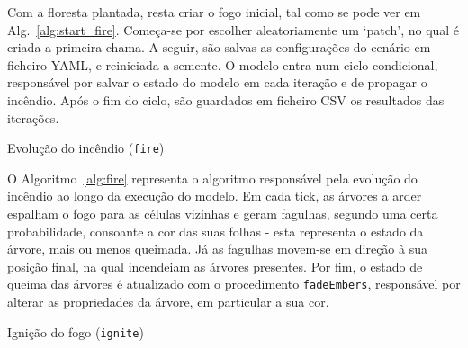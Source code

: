 Com a floresta plantada, resta criar o fogo inicial, tal como se pode ver em Alg.~\ref{alg:start_fire}.
Começa-se por escolher aleatoriamente um ‘patch’, no qual é criada a primeira chama.
A seguir, são salvas as configurações do cenário em ficheiro YAML, e reiniciada a semente.
O modelo entra num ciclo condicional, responsável por salvar o estado do modelo em cada iteração e de propagar o incêndio.
Após o fim do ciclo, são guardados em ficheiro CSV os resultados das iterações.


\begin{algorithm}
    \caption{Evolução do incêndio (\texttt{fire})}\label{alg:fire}
    \EndFor
    \fadeEmbers{}\;
    \tick{}\;
\end{algorithm}

O Algoritmo~\ref{alg:fire} representa o algoritmo responsável pela evolução do incêndio ao longo da execução do modelo.
Em cada tick, as árvores a arder espalham o fogo para as células vizinhas e geram fagulhas, segundo uma certa probabilidade, consoante a cor das suas folhas - esta representa o estado da árvore, mais ou menos queimada.
Já as fagulhas movem-se em direção à sua posição final, na qual incendeiam as árvores presentes.
Por fim, o estado de queima das árvores é atualizado com o procedimento \texttt{fadeEmbers}, responsável por alterar as propriedades da árvore, em particular a sua cor.

\begin{algorithm}
    \caption{Ignição do fogo (\texttt{ignite})}\label{alg:ignite}
    \;
\end{algorithm}

